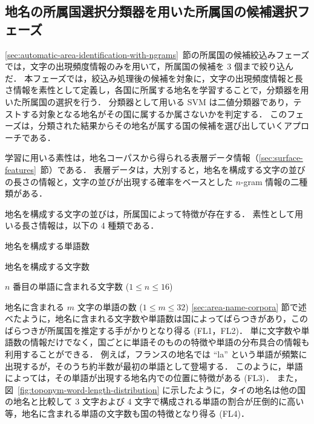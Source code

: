 \documentclass[japanese]{jnlp_1.4}
\renewenvironment{itemize}{}{}
\begin{document}
\subsection{地名の所属国選択分類器を用いた所属国の候補選択フェーズ}
\label{sec:automatic-area-identification-with-svm}

\ref{sec:automatic-area-identification-with-ngrams}~節の所属国の候補絞込みフェーズでは，文字の出現頻度情報のみを用いて，所属国の候補を 3 個まで絞り込んだ．
本フェーズでは，絞込み処理後の候補を対象に，文字の出現頻度情報と長さ情報を素性として定義し，各国に所属する地名を学習することで，分類器を用いた所属国の選択を行う．
分類器として用いる SVM は二値分類器であり，テストする対象となる地名がその国に属するか属さないかを判定する．
このフェーズは，分類された結果からその地名が属する国の候補を選び出していくアプローチである．

学習に用いる素性は，地名コーパスから得られる表層データ情報（\ref{sec:surface-features}~節）である．
表層データは，大別すると，地名を構成する文字の並びの長さの情報と，文字の並びが出現する確率をベースとした $n$-gram 情報の二種類がある．

地名を構成する文字の並びは，所属国によって特徴が存在する．
素性として用いる長さ情報は，以下の 4 種類である．
\begin{itemize}
 \item[(FL1)] 地名を構成する単語数 
 \item[(FL2)] 地名を構成する文字数 
 \item[(FL3)] $n$ 番目の単語に含まれる文字数 ($1 \le n \le 16$) 
 \item[(FL4)] 地名に含まれる $m$ 文字の単語の数 ($1 \le m \le 32$) 
\end{itemize}
\ref{sec:area-name-corpora} 節で述べたように，地名に含まれる文字数や単語数は国によってばらつきがあり，このばらつきが所属国を推定する手がかりとなり得る (FL1，FL2)．
単に文字数や単語数の情報だけでなく，国ごとに単語そのものの特徴や単語の分布具合の情報も利用することができる．
例えば，フランスの地名では ``la'' という単語が頻繁に出現するが，そのうち約半数が最初の単語として登場する．
このように，単語によっては，その単語が出現する地名内での位置に特徴がある (FL3)．
また，図~\ref{fig:toponym-word-length-distribution} に示したように，タイの地名は他の国の地名と比較して 3 文字および 4 文字で構成される単語の割合が圧倒的に高い等，地名に含まれる単語の文字数も国の特徴となり得る (FL4)．
\end{document}
